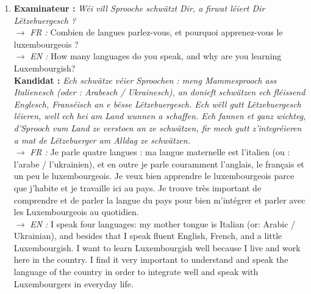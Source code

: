 \begin{enumerate}
    \vspace{0.4em}

    \item \textbf{Examinateur :} \textit{Wéi vill Sprooche schwätzt Dir, a firwat léiert Dir Lëtzebuergesch ?} \\
    $\rightarrow$ \textit{FR :} Combien de langues parlez-vous, et pourquoi apprenez-vous le luxembourgeois ? \\
    $\rightarrow$ \textit{EN :} How many languages do you speak, and why are you learning Luxembourgish? \\
    \textbf{Kandidat :} \textit{Ech schwätze véier Sproochen : meng Mammesprooch ass Italienesch (oder : Arabesch / Ukrainesch), an donieft schwätzen ech fléissend Englesch, Franséisch an e bësse Lëtzebuergesch. Ech wëll gutt Lëtzebuergesch léieren, well ech hei am Land wunnen a schaffen. Ech fannen et ganz wichteg, d'Sprooch vum Land ze verstoen an ze schwätzen, fir mech gutt z'integréieren a mat de Lëtzebuerger am Alldag ze schwätzen.} \\
    $\rightarrow$ \textit{FR :} Je parle quatre langues : ma langue maternelle est l'italien (ou : l'arabe / l'ukrainien), et en outre je parle couramment l'anglais, le français et un peu le luxembourgeois. Je veux bien apprendre le luxembourgeois parce que j'habite et je travaille ici au pays. Je trouve très important de comprendre et de parler la langue du pays pour bien m'intégrer et parler avec les Luxembourgeois au quotidien. \\
    $\rightarrow$ \textit{EN :} I speak four languages: my mother tongue is Italian (or: Arabic / Ukrainian), and besides that I speak fluent English, French, and a little Luxembourgish. I want to learn Luxembourgish well because I live and work here in the country. I find it very important to understand and speak the language of the country in order to integrate well and speak with Luxembourgers in everyday life.

    \vspace{0.4em}


\end{enumerate}
